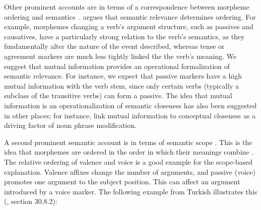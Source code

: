 \documentclass[11pt,letterpaper]{article}
\newcommand{\citep}{\parencite}
\newcommand{\citet}{\Textcite}
\begin{document}



%






Other prominent accounts are in terms of a correspondence between morpheme ordering and semantics~\citep{bybee-morphology-1985,rice2000morpheme}.
\citet{bybee-morphology-1985} argues that semantic relevance determines ordering.
For example, morphemes changing a verb's argument structure, such as passives and causatives, have a particularly strong relation to the verb's semantics, as they fundamentally alter the nature of the event described, whereas tense or agreement markers are much less tightly linked the the verb's meaning.
We suggest that mutual information provides an operational formalization of semantic relevance.
For instance, we expect that passive markers have a high mutual information with the verb stem, since only certain verbs (typically a subclass of the transitive verbs) can form a passive.
The idea that mutual information is an operationalization of semantic closeness has also been suggested in other places; for instance, \citep{culbertson2020from} link mutual information to conceptual closeness as a driving factor of noun phrase modification.

A second prominent semantic account is in terms of semantic scope \citep{rice2000morpheme}.
This is the idea that morphemes are ordered in the order in which their meanings combine \citep[e.g.,][]{rice2000morpheme, caballero2010scope,  narrog2010the, korotkova2010deriving}.
The relative ordering of valence and voice is a good example for the scope-based explanation.
Valence affixes change the number of arguments, and passive (voice) promotes one argument to the subject position.
This can affect an argument introduced by a voice marker.
The following example from Turkish illustrates this (\cite{schaaik2020turkish}, section 30.8.2):
\end{document}
